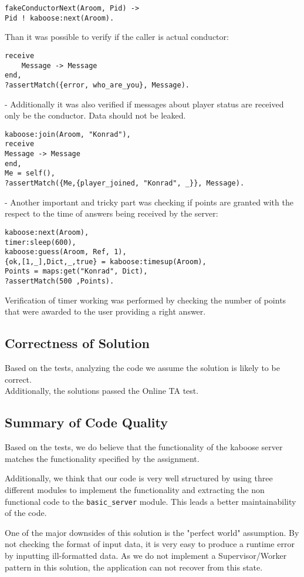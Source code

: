 \documentclass[11pt, a4paper]{article}
\begin{document}
\begin{verbatim}
fakeConductorNext(Aroom, Pid) ->
Pid ! kaboose:next(Aroom). 
\end{verbatim}

\noindent Than it was possible to verify if the caller is actual conductor:

\begin{verbatim}
receive 
	Message -> Message
end,
?assertMatch({error, who_are_you}, Message).
\end{verbatim}

\noindent- Additionally it was also verified if messages about player status are received only be the conductor. Data should not be leaked. 

\begin{verbatim}
kaboose:join(Aroom, "Konrad"),
receive 
Message -> Message
end,
Me = self(),
?assertMatch({Me,{player_joined, "Konrad", _}}, Message).
\end{verbatim}

\noindent - Another important and tricky part was checking if points are granted with the respect to the time of answers being received by the server:

\begin{verbatim}
kaboose:next(Aroom),
timer:sleep(600),
kaboose:guess(Aroom, Ref, 1),
{ok,[1,_],Dict,_,true} = kaboose:timesup(Aroom),
Points = maps:get("Konrad", Dict),
?assertMatch(500 ,Points).
\end{verbatim}
Verification of timer working was performed by checking the number of points that were awarded to the user providing a right answer. 

\subsection{Correctness of Solution}
Based on the tests, analyzing the code we assume the solution is likely to be correct.
\\
Additionally, the solutions passed the Online TA test.

\subsection{Summary of Code Quality}
Based on the tests, we do believe that the functionality of the kaboose server matches the functionality specified by the assignment.

Additionally, we think that our code is very well structured by using three different modules to implement the functionality and extracting the non functional code to the \texttt{basic\_server} module. This leads a better maintainability of the code.

One of the major downsides of this solution is the "perfect world" assumption. By not checking the format of input data, it is very easy to produce a runtime error by inputting ill-formatted data. As we do not implement a Supervisor/Worker pattern in this solution, the application can not recover from this state.
\end{document}
